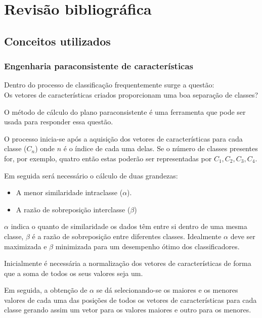 \chapter{Revisão bibliográfica} \label{chap:revBibli}
	\section{Conceitos utilizados}
			\subsection{Engenharia paraconsistente de características}
				\par Dentro do processo de classificação frequentemente surge a questão:\\
				Os vetores de características criados proporcionam uma boa separação de classes?
				
				\par O método de cálculo do plano paraconsistente é uma ferramenta que pode ser usada para responder essa questão.
				
				\par O processo inicia-se após a aquisição dos vetores de características para cada classe ($C_n$) onde $n$ é o índice de cada uma delas. Se o número de classes presentes for, por exemplo, quatro então estas poderão ser representadas por $C_1, C_2, C_3, C_4$.
				\par Em seguida será necessário o cálculo de duas grandezas:
				
				\begin{itemize}
					\item A menor similaridade intraclasse ($\alpha$).
					\item A razão de sobreposição interclasse ($\beta$)
				\end{itemize}
			
				\par $\alpha$ indica o quanto de similaridade os dados têm entre si dentro de uma mesma classe, $\beta$ é a razão de sobreposição entre diferentes classes. Idealmente $\alpha$ deve ser maximizada e $\beta$ minimizada para um desempenho ótimo dos classificadores.
				
				\par Inicialmente é necessária a normalização dos vetores de características de forma que a soma de todos os seus valores seja um.
				
				\par Em seguida, a obtenção de $\alpha$ se dá selecionando-se os maiores e os menores valores de cada uma das posições de todos os vetores de características para cada classe gerando assim um vetor para os valores maiores e outro para os menores.
				
